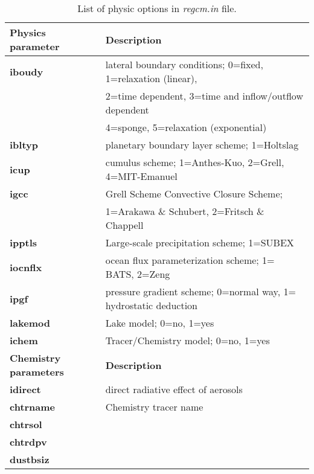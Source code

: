 \begin{table}[h]
\begin{center}
\caption{List of physic options in {\it regcm.in} file.}  \label{regcm_file2}
\vspace{0.25cm}
\begin{tabular}{|l|l|} \hline \hline
{\small {\bf Physics parameter}} & {\small {\bf Description}} \\ \hline \hline
{\footnotesize {\bf iboudy}}   & {\footnotesize lateral boundary conditions; 0=fixed, 1=relaxation (linear),} \\ 
  &  {\footnotesize 2=time dependent, 3=time and inflow/outflow dependent} \\
  &  {\footnotesize 4=sponge, 5=relaxation (exponential)} \\ \hline
{\footnotesize {\bf ibltyp}}   &  {\footnotesize planetary boundary layer scheme; 1=Holtslag} \\ \hline
{\footnotesize {\bf icup}}     & {\footnotesize cumulus scheme; 1=Anthes-Kuo, 2=Grell, 4=MIT-Emanuel}  \\ \hline
\hspace{.3cm} {\footnotesize {\bf igcc}}     & {\footnotesize Grell Scheme Convective Closure Scheme;} \\ 
  & {\footnotesize 1=Arakawa \& Schubert, 2=Fritsch \& Chappell} \\ \hline
{\footnotesize {\bf ipptls}}   & {\footnotesize Large-scale precipitation scheme; 1=SUBEX} \\ \hline
{\footnotesize {\bf iocnflx}}  & {\footnotesize ocean flux parameterization scheme;  1= BATS, 2=Zeng}\\ \hline
{\footnotesize {\bf ipgf}}     & {\footnotesize pressure gradient scheme; 0=normal way, 1= hydrostatic deduction} \\ \hline
{\footnotesize {\bf lakemod}}  & {\footnotesize Lake model;  0=no, 1=yes} \\ \hline
{\footnotesize {\bf ichem}}  & {\footnotesize Tracer/Chemistry  model;  0=no, 1=yes} \\ \hline
{\small {\bf Chemistry parameters}} & {\small {\bf Description}} \\ \hline \hline
{\footnotesize {\bf idirect}}   & {\footnotesize direct radiative effect of aerosols } \\ \hline
{\footnotesize {\bf chtrname}}   & {\footnotesize Chemistry tracer name} \\ \hline
{\footnotesize {\bf chtrsol}}   & {\footnotesize } \\ \hline
{\footnotesize {\bf chtrdpv}}   & {\footnotesize } \\ \hline
{\footnotesize {\bf dustbsiz}}   & {\footnotesize } \\ \hline
\end{tabular}
\end{center}
\end{table}


